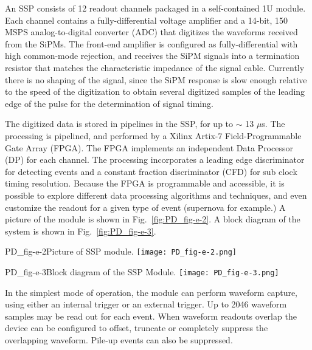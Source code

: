 An SSP consists of 12 readout channels packaged in a self-contained 
1U module.  
Each channel contains a fully-differential voltage amplifier and a 
14-bit, 150 MSPS analog-to-digital converter (ADC) that 
digitizes the waveforms received from the SiPMs.  
The front-end amplifier is configured as fully-differential with high common-mode 
rejection, and receives the SiPM signals into a termination resistor that 
matches the characteristic impedance of the signal cable. 
Currently there is no shaping of the signal, since the SiPM response 
is slow enough relative to the speed of the digitization to obtain 
several digitized samples of the leading edge of the pulse for the determination of signal timing.  

The digitized data is stored in pipelines in the SSP, for up to $\sim$ 13 $\mu$s.  
The processing is pipelined, and performed by a Xilinx Artix-7 
Field-Programmable Gate Array (FPGA).  
The FPGA implements an independent Data Processor (DP) for each channel.  
The processing incorporates a leading edge discriminator for detecting events
and a constant fraction discriminator (CFD) for sub 
clock timing resolution.  
Because the FPGA is programmable and accessible, it is possible to explore 
different data processing algorithms and techniques, and even customize the 
readout for a given type of event (supernova for example.)  
A picture of the module is shown in Fig.~\ref{fig:PD_fig-e-2}.  
A block diagram of the system is shown in Fig.~\ref{fig:PD_fig-e-3}.
%
\begin{cdrfigure}{PD_fig-e-2}{Picture of SSP module.}
  \texttt{[image: PD\_fig-e-2.png]}
\end{cdrfigure}

\begin{cdrfigure}{PD_fig-e-3}{Block diagram of the SSP Module.}
  \texttt{[image: PD\_fig-e-3.png]}
\end{cdrfigure}
%
In the simplest mode of operation, the module can perform waveform capture, 
using either an internal trigger or an external trigger.  
Up to 2046 waveform samples may be read out for each event.  When waveform 
readouts overlap the device can be configured to offset, 
truncate or completely suppress the overlapping waveform.  
Pile-up events can also be suppressed.  

